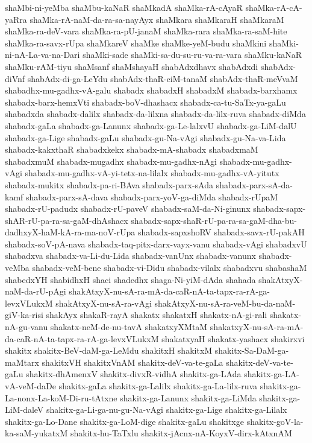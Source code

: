 {shaMbi-ni-yeMba
shaMbu-kaNaR
shaMkadA
shaMka-rA-cAyaR
shaMka-rA-cA-yaRra
shaMka-rA-naM-da-ra-sa-nayAyx
shaMkara
shaMkaraH
shaMkaraM
shaMka-ra-deV-vara
shaMka-ra-pU-janaM
shaMka-rara
shaMka-ra-saM-hite
shaMka-ra-savx-rUpa
shaMkareV
shaMke
shaMke-yeM-budu
shaMkini
shaMki-ni-nA-La-va-na-Dari
shaMki-sade
shaMki-sa-du-su-ru-va-ra-vara
shaMku-kaNaR
shaMku-rAM-tiyu
shaMsanf
shaMshayaH
shabAdxdhavx
shabAdxdi
shabAdx-diVnf
shabAdx-di-ga-LeYdu
shabAdx-thaR-ciM-tanaM
shabAdx-thaR-meVvaM
shabadhx-mu-gadhx-vA-galu
shabadx
shabadxH
shabadxM
shabadx-barxhamx
shabadx-barx-hemxVti
shabadx-boV-dhashacx
shabadx-ca-tu-SaTx-ya-gaLu
shabadxda
shabadx-dalilx
shabadx-da-lilxna
shabadx-da-lilx-ruva
shabadx-diMda
shabadx-gaLa
shabadx-ga-Lanunx
shabadx-ga-Le-lalxvU
shabadx-ga-LiM-dalU
shabadx-ga-Lige
shabadx-gaLu
shabadx-gu-Na-vAgi
shabadx-gu-Na-va-Lida
shabadx-kakxthaR
shabadxkekx
shabadx-mA-shabadx
shabadxmaM
shabadxmuM
shabadx-mugadhx
shabadx-mu-gadhx-nAgi
shabadx-mu-gadhx-vAgi
shabadx-mu-gadhx-vA-yi-tetx-na-lilalx
shabadx-mu-gadhx-vA-yitutx
shabadx-mukitx
shabadx-pa-ri-BAva
shabadx-parx-sAda
shabadx-parx-sA-da-kamf
shabadx-parx-sA-dava
shabadx-parx-yoV-ga-diMda
shabadx-rUpaM
shabadx-rU-padudx
shabadx-rU-paveV
shabadx-saM-da-Ni-ginunx
shabadx-sapx-shAR-rU-pa-ra-sa-gaM-dhAshacx
shabadx-sapx-shaR-rU-pa-ra-sa-gaM-dha-bu-dadhxyX-haM-kA-ra-ma-noV-rUpa
shabadx-sapxshoRV
shabadx-savx-rU-pakAH
shabadx-soV-pA-nava
shabadx-taq-pitx-darx-vayx-vanu
shabadx-vAgi
shabadxvU
shabadxva
shabadx-va-Li-du-Lida
shabadx-vanUnx
shabadx-vanunx
shabadx-veMba
shabadx-veM-bene
shabadx-vi-Didu
shabadx-vilalx
shabadxvu
shabashaM
shabedxYH
shabidhxH
shaci
shadedhx
shaga-Ni-yiM-dAda
shahada
shakAtxyX-naM-da-rU-pAgi
shakAtxyX-nu-sA-ra-mA-da-caR-nA-ta-tapx-ra-rA-ga-levxVLukxM
shakAtxyX-nu-sA-ra-vAgi
shakAtxyX-nu-sA-ra-veM-bu-da-naM-giV-ka-risi
shakAyx
shakaR-rayA
shakatx
shakatxH
shakatx-nA-gi-rali
shakatx-nA-gu-vanu
shakatx-neM-de-nu-tavA
shakatxyXMtaM
shakatxyX-nu-sA-ra-mA-da-caR-nA-ta-tapx-ra-rA-ga-levxVLukxM
shakatxyaH
shakatx-yashacx
shakirxvi
shakitx
shakitx-BeV-daM-ga-LeMdu
shakitxH
shakitxM
shakitx-Sa-DaM-ga-maMtarx
shakitxVH
shakitxVnAM
shakitx-deV-va-te-gaLa
shakitx-deV-va-te-gaLu
shakitx-dhAmenxV
shakitx-divxR-vidhA
shakitx-ga-LAda
shakitx-ga-LA-vA-veM-daDe
shakitx-gaLa
shakitx-ga-Lalilx
shakitx-ga-La-lilx-ruva
shakitx-ga-La-nonx-La-koM-Di-ru-tAtxne
shakitx-ga-Lanunx
shakitx-ga-LiMda
shakitx-ga-LiM-daleV
shakitx-ga-Li-ga-nu-gu-Na-vAgi
shakitx-ga-Lige
shakitx-ga-Lilalx
shakitx-ga-Lo-Dane
shakitx-ga-LoM-dige
shakitx-gaLu
shakitxge
shakitx-goV-la-ka-saM-yukatxM
shakitx-hu-TaTxlu
shakitx-jAcnx-nA-KoyxV-dirx-kAtxnAM
}
